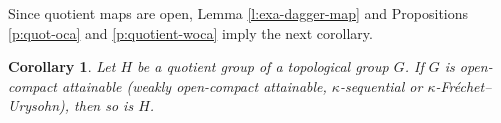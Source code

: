 \documentclass[preprint,11pt]{elsarticle}
\newtheorem{corollary}[theorem]{Corollary}
\newtheorem{problem}[theorem]{Problem}
\numberwithin{equation}{section}
\numberwithin{theorem}{section}
\newcommand{\w}{\omega}
\newcommand{\IR}{\mathbb{R}}
\begin{document}
Since quotient maps are open, Lemma \ref{l:exa-dagger-map} and Propositions \ref{p:quot-oca} and \ref{p:quotient-woca} imply the next corollary.
\begin{corollary} \label{c:quotient-woca-group}
Let $H$ be a quotient group of a topological group $G$. If $G$ is open-compact attainable {\rm(}weakly open-compact attainable,  $\kappa$-sequential or $\kappa$-Fr\'{e}chet--Urysohn{\rm)}, then so is $H$.
\end{corollary}








\end{document}
